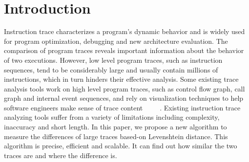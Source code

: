 \documentclass[10pt,journal,cspaper,compsoc]{IEEEtran}
\begin{document}
%
\IEEEpeerreviewmaketitle



\section{Introduction}
Instruction trace characterizes a program's dynamic behavior and is
widely used for program optimization, debugging and new architecture
evaluation. The comparison of program traces reveals important
information about the behavior of two executions. However, low level
program traces, such as instruction sequences, tend to be
considerably large and usually contain millions of instructions,
which in turn hinders their effective analysis. Some existing trace
analysis tools work on high level program traces, such as control
flow graph, call graph and internal event sequences, and rely on
visualization techniques to help software engineers make sense of
trace
content~\cite{trace11}~\cite{trace05}~\cite{trace99}~\cite{trace06}~\cite{trace052}.
Existing instruction trace analyzing tools suffer from a variety of
limitations including complexity, inaccuracy and short length. %
In this paper, we propose a new algorithm to measure the differences
of large traces based-on Levenshtein distance. This algorithm is
precise, efficient and scalable. It can find out how similar the two
traces are and where the difference is.

\end{document}
